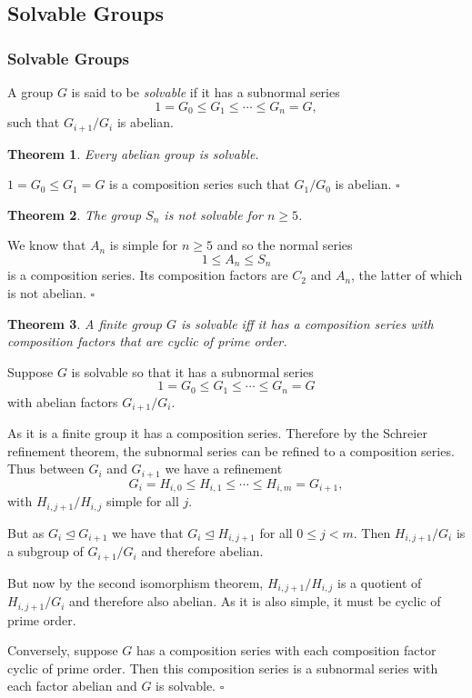 \documentclass[10pt]{article}
\newtheorem{theorem}{Theorem}[section]
\newenvironment{proof}[1][Proof]{\begin{trivlist}
\item[\hskip \labelsep {\itshape #1}]}{\end{trivlist}}
\newenvironment{definition}[1][Definition]{\begin{trivlist}
\item[\hskip \labelsep {\bfseries #1}]}{\end{trivlist}}
\begin{document}
\subsection{Solvable Groups}

\subsubsection{Solvable Groups}

\begin{definition}
A group $G$ is said to be \emph{solvable} if it has a subnormal series
$$1 = G_0 \leq G_1 \leq \cdots \leq G_n = G,$$
such that $G_{i+1}/G_i$ is abelian.
\end{definition}

\begin{theorem}
Every abelian group is solvable.
\end{theorem}

\begin{proof}
$1 = G_0 \leq G_1 = G$ is a composition series such that $G_1/G_0$ is abelian. $\square$
\end{proof}

\begin{theorem}
The group $S_n$ is not solvable for $n \geq 5$.
\end{theorem}

\begin{proof}
We know that $A_n$ is simple for $n \geq 5$ and so the normal series
$$1 \leq A_n \leq S_n$$
is a composition series. Its composition factors are $C_2$ and $A_n$, the latter of which is not abelian. $\square$
\end{proof}

\begin{theorem}
A finite group $G$ is solvable iff it has a composition series with composition factors that are cyclic of prime order.
\end{theorem}

\begin{proof}
Suppose $G$ is solvable so that it has a subnormal series
$$1 = G_0 \leq G_1 \leq \cdots \leq G_n = G$$
with abelian factors $G_{i+1}/G_i$.

As it is a finite group it has a composition series. Therefore by the Schreier refinement theorem, the subnormal series can be refined to a composition series. Thus between $G_i$ and $G_{i+1}$ we have a refinement
$$G_i = H_{i,0} \leq H_{i,1} \leq \cdots \leq H_{i, m} = G_{i+1},$$
with $H_{i, j+1}/H_{i, j}$ simple for all $j$.

But as $G_i \mathrel{\unlhd} G_{i+1}$ we have that $G_i \mathrel{\unlhd} H_{i, j+1}$ for all $0 \leq j < m$. Then $H_{i, j+1}/G_i$ is a subgroup of $G_{i+1}/G_i$ and therefore abelian.

But now by the second isomorphism theorem, $H_{i, j+1}/H_{i, j}$ is a quotient of $H_{i, j+1}/G_i$ and therefore also abelian. As it is also simple, it must be cyclic of prime order.

Conversely, suppose $G$ has a composition series with each composition factor cyclic of prime order. Then this composition series is a subnormal series with each factor abelian and $G$ is solvable. $\square$
\end{proof}
\end{document}

